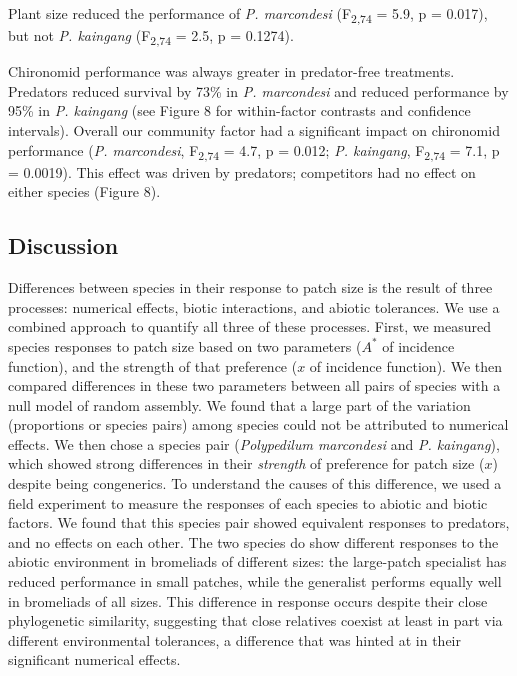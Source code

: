 Plant size reduced the performance of \emph{P. marcondesi}
(F\textsubscript{2,74} = 5.9, p = 0.017), but not \emph{P. kaingang}
(F\textsubscript{2,74} = 2.5, p = 0.1274).

Chironomid performance was always greater in predator-free treatments.
Predators reduced survival by 73\% in \emph{P. marcondesi} and reduced
performance by 95\% in \emph{P. kaingang} (see Figure 8 for
within-factor contrasts and confidence intervals). Overall our community
factor had a significant impact on chironomid performance (\emph{P.
marcondesi}, F\textsubscript{2,74} = 4.7, p = 0.012; \emph{P. kaingang},
F\textsubscript{2,74} = 7.1, p = 0.0019). This effect was driven by
predators; competitors had no effect on either species (Figure 8).

\subsection{Discussion}\label{discussion}

Differences between species in their response to patch size is the
result of three processes: numerical effects, biotic interactions, and
abiotic tolerances. We use a combined approach to quantify all three of
these processes. First, we measured species responses to patch size
based on two parameters (\(A^{*}\) of incidence function), and the
strength of that preference (\(x\) of incidence function). We then
compared differences in these two parameters between all pairs of
species with a null model of random assembly. We found that a large part
of the variation (proportions or species pairs) among species could not
be attributed to numerical effects. We then chose a species pair
(\emph{Polypedilum marcondesi} and \emph{P. kaingang}), which showed
strong differences in their \emph{strength} of preference for patch size
(\(x\)) despite being congenerics. To understand the causes of this
difference, we used a field experiment to measure the responses of each
species to abiotic and biotic factors. We found that this species pair
showed equivalent responses to predators, and no effects on each other.
The two species do show different responses to the abiotic environment
in bromeliads of different sizes: the large-patch specialist has reduced
performance in small patches, while the generalist performs equally well
in bromeliads of all sizes. This difference in response occurs despite
their close phylogenetic similarity, suggesting that close relatives
coexist at least in part via different environmental tolerances, a
difference that was hinted at in their significant numerical effects.

